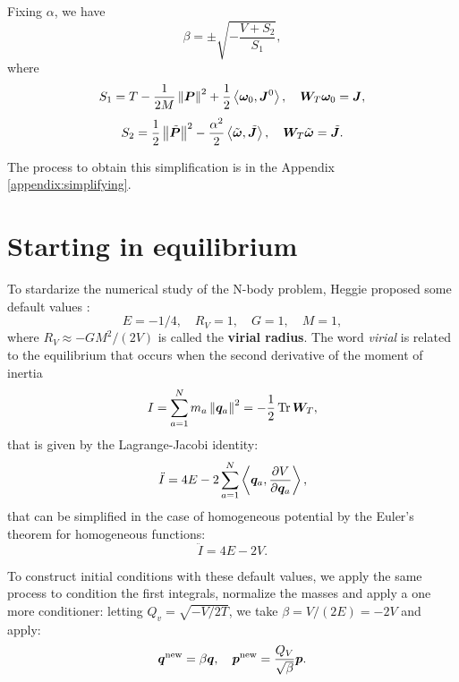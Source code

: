 \documentclass{article}
\begin{document}
Fixing $\alpha$, we have
\begin{equation}
    \beta = \pm \sqrt{- \dfrac{V + S_2}{S_1}},
\end{equation}
where
\begin{equation}
S_1 = T - \dfrac{1}{2 M} \left\Vert \bm P \right\Vert^2 + \dfrac{1}{2} \left\langle \bm \omega_0, \bm J^0 \right\rangle,
\quad
\bm W_T \bm \omega_0 = \bm J,
\end{equation}
\begin{equation}
S_2 = \dfrac{1}{2} \left\Vert \tilde{\bm P} \right\Vert^2 - \dfrac{\alpha^2}{2} \left\langle \tilde{\bm \omega}, \tilde{\bm J} \right\rangle,
\quad
\bm W_T \tilde{\bm \omega} = \tilde{\bm J}.
\end{equation}

The process to obtain this simplification is in the Appendix \ref{appendix:simplifying}.

\section{Starting in equilibrium}
To stardarize the numerical study of the N-body problem, Heggie proposed some default values \cite{heggie_mathieu_unidades}:
\begin{equation}
E = - 1/4, \quad R_V = 1, \quad G = 1, \quad M = 1,
\end{equation}
where $R_V \approx - GM^2/(2 V)$ is called the \textbf{virial radius}. The word \textit{virial} is related to the equilibrium that occurs when the second derivative of the moment of inertia
\begin{equation}
I = \sum_{a=1}^N m_a \left\Vert \bm q_a \right\Vert^2 = -\dfrac{1}{2} \operatorname{Tr}{\bm W_T},
\end{equation}
that is given by the Lagrange-Jacobi identity:
\begin{equation}\label{eq:lagrange-jacobi-expanded}
\ddot I = 4 E - 2 \sum_{a=1}^N \left\langle \bm q_a, \dfrac{\partial V}{\partial \bm q_a} \right\rangle,
\end{equation}
that can be simplified in the case of homogeneous potential by the Euler's theorem for homogeneous functions:
\begin{equation}
\ddot I = 4 E - 2 V.
\end{equation}

To construct initial conditions with these default values, we apply the same process to condition the first integrals, normalize the masses and apply a one more conditioner: letting $Q_v = \sqrt{- V/{2T}}$, we take $\beta = V/(2E) = -2V$ and apply:
\begin{equation}
    \bm q^{\text{new}} = \beta \bm q,
    \quad
    \bm p^{\text{new}} = \dfrac{Q_V}{\sqrt{\beta}} \bm p.
\end{equation}
\end{document}

